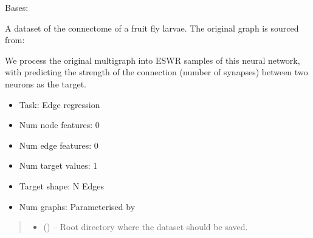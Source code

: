\documentclass[letterpaper,10pt,english]{sphinxhowto}
\begin{document}
\begin{fulllineitems}
\label{\detokenize{datasets:datasets.NeuralDataset}}
\pysigstartsignatures
{}
\pysigstopsignatures
\sphinxAtStartPar
Bases: 

\sphinxAtStartPar
A dataset of the connectome of a fruit fly larvae.
The original graph is sourced from:
\begin{quote}

\sphinxAtStartPar
{}
\end{quote}

\sphinxAtStartPar
We process the original multigraph into ESWR samples of this neural network, with predicting the strength of the connection (number of synapses) between two neurons as the target.
\begin{itemize}
\item {} 
\sphinxAtStartPar
Task: Edge regression

\item {} 
\sphinxAtStartPar
Num node features: 0

\item {} 
\sphinxAtStartPar
Num edge features: 0

\item {} 
\sphinxAtStartPar
Num target values: 1

\item {} 
\sphinxAtStartPar
Target shape: N Edges

\item {} 
\sphinxAtStartPar
Num graphs: Parameterised by 

\end{itemize}
\begin{quote}\begin{description}
\begin{itemize}
\item {} 
\sphinxAtStartPar
{} () – Root directory where the dataset should be saved.


\end{itemize}
\end{description}
\end{quote}
\end{fulllineitems}
\end{document}
